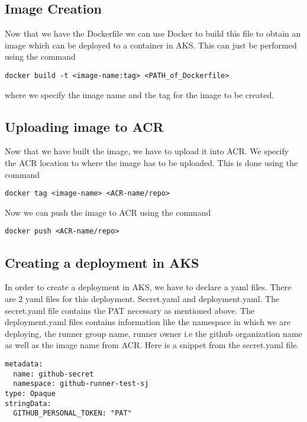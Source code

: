 \subsection{Image Creation}
Now that we have the Dockerfile we can use Docker to build this file to obtain an image which can be deployed to a container in AKS. This can just be performed using the command 
\begin{lstlisting}[breaklines]
docker build -t <image-name:tag> <PATH_of_Dockerfile>
\end{lstlisting}
where we specify the image name and the tag for the image to be created.

\subsection{Uploading image to ACR}
Now that we have built the image, we have to upload it into ACR. We specify the ACR location to where the image has to be uploaded. This is done using the command 

\begin{lstlisting}[breaklines]
docker tag <image-name> <ACR-name/repo>
\end{lstlisting}

Now we can push the image to ACR using the command

\begin{lstlisting}[breaklines]
docker push <ACR-name/repo>
\end{lstlisting}

\subsection{Creating a deployment in AKS} 
In order to create a deployment in AKS, we have to declare a yaml files. There are 2 yaml files for this deployment. Secret.yaml and deployment.yaml. The secret.yaml file contains the PAT necessary as mentioned above. The deployment.yaml files contains information like the namespace in which we are deploying, the runner group name, runner owner i.e the github organization name as well as the image name from ACR.
Here is a snippet from the secret.yaml file.

\begin{lstlisting}[breaklines]
metadata:
  name: github-secret
  namespace: github-runner-test-sj
type: Opaque
stringData:
  GITHUB_PERSONAL_TOKEN: "PAT"
\end{lstlisting}

